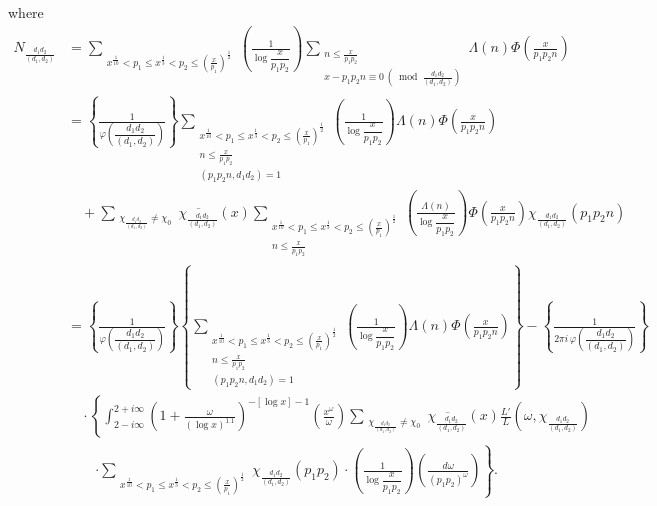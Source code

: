 where
\begin{align*}
N_{\frac{d_1d_2}{(d_1,d_2)}}
&=\sum_{\substack{x^{\frac1{10}}<p_1\leqslant x^{\frac13}<p_2\leqslant(\frac{x}{p_1})^{\frac12}}}
\left(\frac{1}{\log\dfrac{x}{p_1p_2}}\right)
\sum_{\substack{n\leqslant\frac{x}{p_1p_2}\\x-p_1p_2n\equiv0\,\left(\bmod\frac{d_1d_2}{(d_1,d_2)}\right)}}
\Lambda(n)\Phi\left(\frac{x}{p_1p_2n}\right)\\
&=\left\{\frac{1}{\varphi\left(\dfrac{d_1d_2}{(d_1,d_2)}\right)}\right\}
\sum_{\substack{x^{\frac1{10}}<p_1\leqslant x^{\frac13}<p_2\leqslant(\frac{x}{p_1})^{\frac12}\\n\leqslant\frac{x}{p_1p_2}\\(p_1p_2n,d_1d_2)=1}}
\left(\frac{1}{\log\dfrac{x}{p_1p_2}}\right)
\Lambda(n)\Phi\left(\frac{x}{p_1p_2n}\right)\\
&\quad+\sum_{\substack{\chi_{\frac{d_1d_2}{(d_1,d_2)}}\neq\chi_0}}
\overline{\chi_{\frac{d_1d_2}{(d_1,d_2)}}}(x)
\sum_{\substack{x^{\frac1{10}}<p_1\leqslant x^{\frac13}<p_2\leqslant(\frac{x}{p_1})^{\frac12}\\n\leqslant\frac{x}{p_1p_2}}}
\left(\frac{\Lambda(n)}{\log\dfrac{x}{p_1p_2}}\right)
\Phi\left(\frac{x}{p_1p_2n}\right)
\chi_{\frac{d_1d_2}{(d_1,d_2)}}(p_1p_2n)\\
&=\left\{\frac{1}{\varphi\left(\dfrac{d_1d_2}{(d_1,d_2)}\right)}\right\}
\left\{
\sum_{\substack{x^{\frac1{10}}<p_1\leqslant x^{\frac13}<p_2\leqslant(\frac{x}{p_1})^{\frac12}\\n\leqslant\frac{x}{p_1p_2}\\(p_1p_2n,d_1d_2)=1}}
\left(\frac{1}{\log\dfrac{x}{p_1p_2}}\right)
\Lambda(n)\Phi\left(\frac{x}{p_1p_2n}\right)
\right\}
-\left\{\frac{1}{2\pi i\,\varphi\left(\dfrac{d_1d_2}{(d_1,d_2)}\right)}\right\}\\
&\quad\cdot\left\{\int_{2-i\infty}^{2+i\infty}
\left(1+\frac{\omega}{(\log x)^{1.1}}\right)^{-[\log x]-1}
\left(\frac{x^\omega}{\omega}\right)
\sum_{\substack{\chi_{\frac{d_1d_2}{(d_1,d_2)}}\neq\chi_0}}
\overline{\chi_{\frac{d_1d_2}{(d_1,d_2)}}}(x)
\frac{L'}{L}(\omega,\chi_{\frac{d_1d_2}{(d_1,d_2)}})\right.\\
&\qquad\left.\cdot\sum_{\substack{x^{\frac1{10}}<p_1\leqslant x^{\frac13}<p_2\leqslant(\frac{x}{p_1})^{\frac12}}}
\chi_{\frac{d_1d_2}{(d_1,d_2)}}(p_1p_2)\cdot
\left(\frac{1}{\log\dfrac{x}{p_1p_2}}\right)
\left(\frac{d\omega}{(p_1p_2)^\omega}\right)\right\}.\tag{6}
\end{align*}
